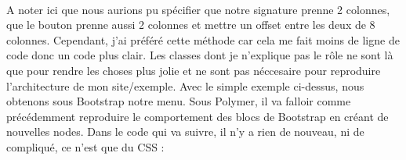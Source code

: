 \documentclass{article}
\begin{document}
\vspace{0.5cm}\\
A noter ici que nous aurions pu sp\'ecifier que notre signature prenne 2 colonnes, que le bouton prenne aussi 2 colonnes et mettre un offset entre les deux de 8 colonnes. Cependant, j'ai pr\'ef\'er\'e cette m\'ethode car cela me fait moins de ligne de code donc un code plus clair. Les classes dont je n'explique pas le r\^ole ne sont l\`a que pour rendre les choses plus jolie et ne sont pas n\'eccesaire pour reproduire l'architecture de mon site/exemple. Avec le simple exemple ci-dessus, nous obtenons sous Bootstrap notre menu. Sous Polymer, il va falloir comme pr\'ec\'edemment reproduire le comportement des blocs de Bootstrap en cr\'eant de nouvelles nodes. Dans le code qui va suivre, il n'y a rien de nouveau, ni de compliqu\'e, ce n'est que du CSS :
\vspace{0.5cm}\\
\vspace{0.5cm}
\end{document}
